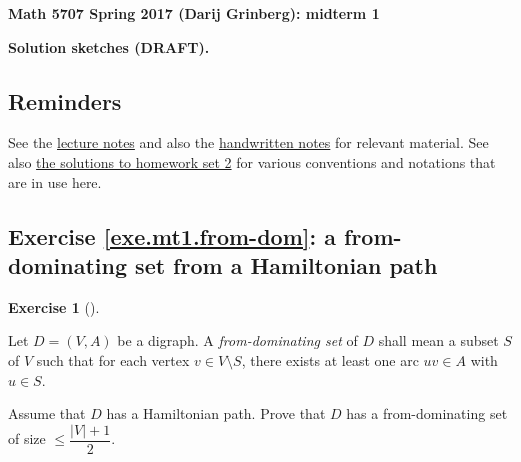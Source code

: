 \documentclass[numbers=enddot,12pt,final,onecolumn,notitlepage]{scrartcl}%
\newcounter{exer}
\theoremstyle{definition}
\newtheorem{exmp}[exer]{Exercise}
\newenvironment{exercise}[1][]
{\begin{exmp}[#1]\begin{leftbar}}
{\end{leftbar}\end{exmp}}
\newcommand{\abs}[1]{\left| #1 \right|}
\newcommand{\tup}[1]{\left( #1 \right)}
\begin{document}
\begin{center}
\textbf{Math 5707 Spring 2017 (Darij Grinberg): midterm 1}

\textbf{Solution sketches (DRAFT).}
\end{center}

\tableofcontents

\subsection{Reminders}

See the
\href{http://www.cip.ifi.lmu.de/~grinberg/t/17s/nogra.pdf}{lecture notes}
and also the
\href{http://www.cip.ifi.lmu.de/~grinberg/t/17s/}{handwritten notes}
for relevant material.
See also
\href{http://www.cip.ifi.lmu.de/~grinberg/t/17s/hw2s.pdf}{the solutions to homework set 2}
for various conventions and notations that are in use here.

\subsection{Exercise \ref{exe.mt1.from-dom}: a from-dominating set
from a Hamiltonian path}

\begin{exercise} \label{exe.mt1.from-dom}
Let $D = \tup{V, A}$ be a digraph. A \textit{from-dominating set} of
$D$ shall mean a subset $S$ of $V$ such that for each vertex $v \in
V \setminus S$, there exists at least one arc $uv \in A$ with
$u \in S$.

Assume that $D$ has a Hamiltonian path. Prove that $D$ has a
from-dominating set of size $\leq \dfrac{\abs{V}+1}{2}$.
\end{exercise}
\end{document}
